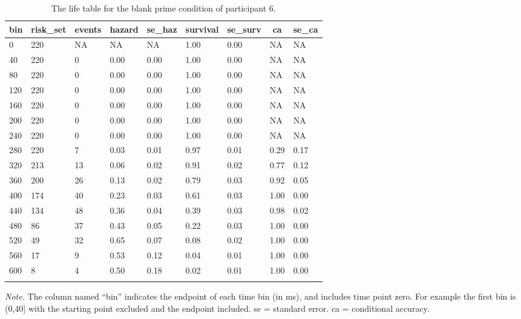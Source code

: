 \documentclass[
  man, donotrepeattitle,floatsintext]{apa6}
\begin{document}
\begin{table}[H]

\begin{center}
\begin{threeparttable}

\caption{\label{tab:life-table}The life table for the blank prime condition of participant 6.}

\begin{tabular}{lllllllll}
\toprule
bin & \multicolumn{1}{c}{risk\_set} & \multicolumn{1}{c}{events} & \multicolumn{1}{c}{hazard} & \multicolumn{1}{c}{se\_haz} & \multicolumn{1}{c}{survival} & \multicolumn{1}{c}{se\_surv} & \multicolumn{1}{c}{ca} & \multicolumn{1}{c}{se\_ca}\\
\midrule
0 & 220 & NA & NA & NA & 1.00 & 0.00 & NA & NA\\
40 & 220 & 0 & 0.00 & 0.00 & 1.00 & 0.00 & NA & NA\\
80 & 220 & 0 & 0.00 & 0.00 & 1.00 & 0.00 & NA & NA\\
120 & 220 & 0 & 0.00 & 0.00 & 1.00 & 0.00 & NA & NA\\
160 & 220 & 0 & 0.00 & 0.00 & 1.00 & 0.00 & NA & NA\\
200 & 220 & 0 & 0.00 & 0.00 & 1.00 & 0.00 & NA & NA\\
240 & 220 & 0 & 0.00 & 0.00 & 1.00 & 0.00 & NA & NA\\
280 & 220 & 7 & 0.03 & 0.01 & 0.97 & 0.01 & 0.29 & 0.17\\
320 & 213 & 13 & 0.06 & 0.02 & 0.91 & 0.02 & 0.77 & 0.12\\
360 & 200 & 26 & 0.13 & 0.02 & 0.79 & 0.03 & 0.92 & 0.05\\
400 & 174 & 40 & 0.23 & 0.03 & 0.61 & 0.03 & 1.00 & 0.00\\
440 & 134 & 48 & 0.36 & 0.04 & 0.39 & 0.03 & 0.98 & 0.02\\
480 & 86 & 37 & 0.43 & 0.05 & 0.22 & 0.03 & 1.00 & 0.00\\
520 & 49 & 32 & 0.65 & 0.07 & 0.08 & 0.02 & 1.00 & 0.00\\
560 & 17 & 9 & 0.53 & 0.12 & 0.04 & 0.01 & 1.00 & 0.00\\
600 & 8 & 4 & 0.50 & 0.18 & 0.02 & 0.01 & 1.00 & 0.00\\
\bottomrule
\addlinespace
\end{tabular}

\begin{tablenotes}[para]
\normalsize{\textit{Note.} The column named ``bin'' indicates the endpoint of each time bin (in ms), and includes time point zero. For example the first bin is (0,40{]} with the starting point excluded and the endpoint included. se = standard error. ca = conditional accuracy.}
\end{tablenotes}

\end{threeparttable}
\end{center}

\end{table}
\end{document}
